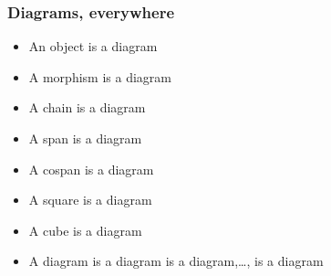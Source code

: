 \documentclass[11pt]{article}
\begin{document}
\subsubsection{Diagrams, everywhere}
\begin{itemize}
\item An object is a diagram
\item A morphism is a diagram
\item A chain is a diagram
\item A span is a diagram
\item A cospan is a diagram
\item A square is a diagram
\item A cube is a diagram
\item A diagram is a diagram is a diagram,\dots, is a diagram
\end{itemize}
\end{document}
